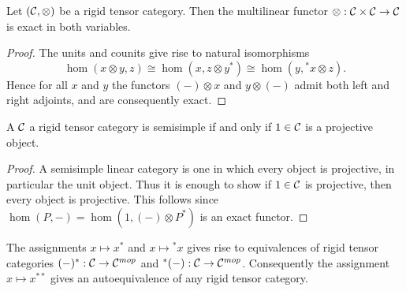 \documentclass{amsart}
\begin{document}
\begin{lemma} \label{lma:RigidIsExact}
	Let $(\mathcal C, \otimes)$ be a rigid tensor category. Then the multilinear functor $\otimes: \mathcal C \times \mathcal C \to \mathcal C$ is exact in both variables. 
\end{lemma}

\begin{proof}
	The units and counits give rise to natural isomorphisms
 \begin{equation*}
 	\hom(x \otimes y, z) \cong \hom( x, z \otimes y^*) \cong \hom(y, {}^*x \otimes z).
 \end{equation*}
	Hence for all $x$ and $y$ the functors $(-)\otimes x$ and $y \otimes (-)$ admit both left and right adjoints, and are consequently exact. 
\end{proof}

\begin{corollary}
	A $\mathcal C$ a rigid tensor category is semisimple if and only if $1 \in \mathcal C$ is a projective object. 
\end{corollary}

\begin{proof}
	A semisimple linear category is one in which every object is projective, in particular the unit object. Thus it is enough to show if $1 \in \mathcal C$ is projective, then every object is projective. This follows since $\hom(P, -) = \hom( 1, (-) \otimes P^*)$ is an exact functor. 
\end{proof}

\begin{lemma}
	The assignments $x \mapsto x^*$ and $x \mapsto {}^*x$ gives rise to equivalences of rigid tensor categories $(-)^*: \mathcal C \to \mathcal C^{mop}$ and ${}^*(-): \mathcal C \to \mathcal C^{mop}$. Consequently the assignment $x \mapsto x^{**}$ gives an autoequivalence of any rigid tensor category. 
\end{lemma}


\end{document}
